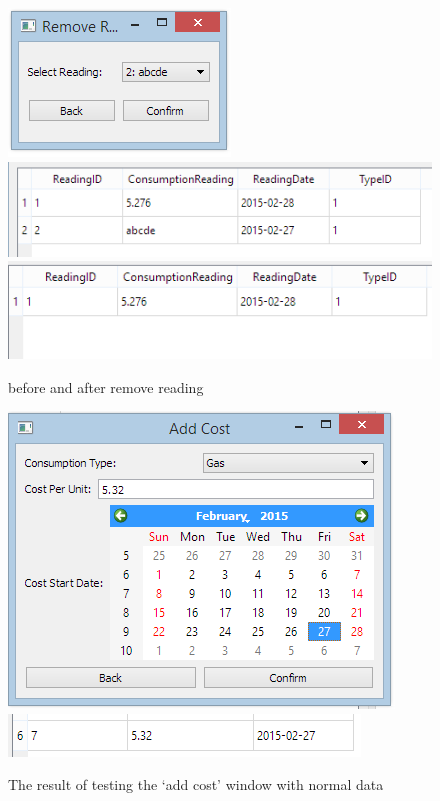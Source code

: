 \begin{figure}[H]
	\includegraphics{./testing/images/test_2_5_remove_reading_data.png}
	\includegraphics{./testing/images/test_2_5_remove_reading_before.png}
	\includegraphics{./testing/images/test_2_5_remove_reading_removed.png}
	\caption{before and after remove reading} \label{fig:test_2.5_result}
\end{figure}

\begin{figure}[H]
	\includegraphics{./testing/images/test_3_1_add_cost_data.png}
	\includegraphics{./testing/images/test_3_1_add_cost_added.png}
	\caption{The result of testing the `add cost' window with normal data} \label{fig:test_3.1_result}
\end{figure}

